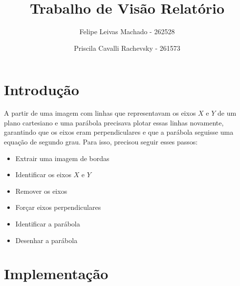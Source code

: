\documentclass{article}
\title{Trabalho de Visão Relatório}
\author{Felipe Leivas Machado - 262528 \and Priscila Cavalli Rachevsky - 261573 }
\begin{document}
\maketitle

\section{Introdução}
    A partir de uma imagem com linhas que representavam os eixos \(X\) e \(Y\) de um plano cartesiano e uma parábola precisava plotar essas linhas novamente, garantindo que os eixos eram perpendiculares e que a parábola seguisse uma equação de segundo grau. Para isso, precisou seguir esses passos:
   \begin{itemize}
       \item Extrair uma imagem de bordas
       \item Identificar os eixos \(X\) e \(Y\)
       \item Remover os eixos
       \item Forçar eixos perpendiculares
       \item Identificar a parábola
       \item Desenhar a parábola
   \end{itemize}
\section{Implementação}
\end{document}
